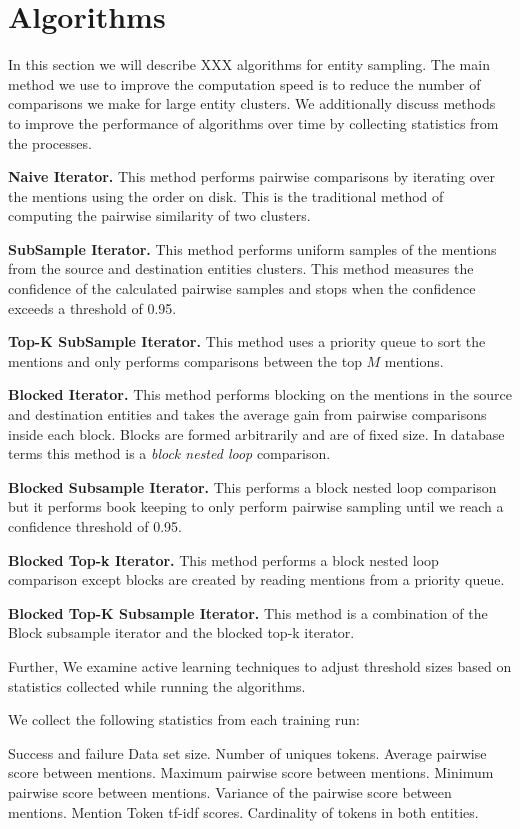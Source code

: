 
\section{Algorithms}

In this section we will describe XXX algorithms for entity sampling.
The main method we use to improve the computation speed is to reduce the
number of comparisons we make for large entity clusters.
We additionally discuss methods to improve the performance of algorithms
over time by collecting statistics from the processes.

\textbf{Naive Iterator.} This method performs pairwise comparisons by 
iterating over the mentions using the order on disk. This is the traditional
method of computing the pairwise similarity of two clusters. 

\textbf{SubSample Iterator.} This method performs uniform samples of the
mentions from the source and destination entities clusters. This method
measures the confidence of the calculated pairwise samples and stops when the
confidence exceeds a threshold of 0.95.

\textbf{Top-K SubSample Iterator.} This method uses a priority queue to sort
the mentions and only performs comparisons between the top $M$ mentions.

\textbf{Blocked Iterator.} This method performs blocking on the mentions in the
source and destination entities and takes the average gain from pairwise
comparisons inside each block. Blocks are formed arbitrarily and are of fixed
size. In database terms this method is a \emph{block nested loop} comparison.

\textbf{Blocked Subsample Iterator.} This performs a block nested loop
comparison but it performs book keeping to only perform pairwise sampling
until we reach a confidence threshold of 0.95.

\textbf{Blocked Top-k Iterator.} This method performs a block nested loop
comparison except blocks are created by reading mentions from a priority queue.

\textbf{Blocked Top-K Subsample Iterator.} This method is a combination of the
Block subsample iterator and the blocked top-k iterator.

Further, We examine active learning techniques to adjust threshold sizes based
on statistics collected while running the algorithms.

We collect the following statistics from each training run:

Success and failure
Data set size.
Number of uniques tokens.
Average pairwise score between mentions.
Maximum pairwise score between mentions.
Minimum pairwise score between mentions.
Variance of the pairwise score between mentions.
Mention Token tf-idf scores.
Cardinality of tokens in both entities.

